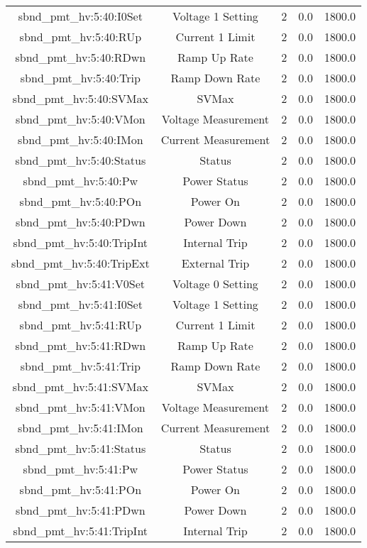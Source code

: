 \begin{center}
\begin{longtable}{c | c c c c }
sbnd\_pmt\_hv:5:40:I0Set & Voltage 1 Setting & 2 & 0.0 & 1800.0\\ 
sbnd\_pmt\_hv:5:40:RUp & Current 1 Limit & 2 & 0.0 & 1800.0\\ 
sbnd\_pmt\_hv:5:40:RDwn & Ramp Up Rate & 2 & 0.0 & 1800.0\\ 
sbnd\_pmt\_hv:5:40:Trip & Ramp Down Rate & 2 & 0.0 & 1800.0\\ 
sbnd\_pmt\_hv:5:40:SVMax & SVMax & 2 & 0.0 & 1800.0\\ 
sbnd\_pmt\_hv:5:40:VMon & Voltage Measurement & 2 & 0.0 & 1800.0\\ 
sbnd\_pmt\_hv:5:40:IMon & Current Measurement & 2 & 0.0 & 1800.0\\ 
sbnd\_pmt\_hv:5:40:Status & Status & 2 & 0.0 & 1800.0\\ 
sbnd\_pmt\_hv:5:40:Pw & Power Status & 2 & 0.0 & 1800.0\\ 
sbnd\_pmt\_hv:5:40:POn & Power On & 2 & 0.0 & 1800.0\\ 
sbnd\_pmt\_hv:5:40:PDwn & Power Down & 2 & 0.0 & 1800.0\\ 
sbnd\_pmt\_hv:5:40:TripInt & Internal Trip & 2 & 0.0 & 1800.0\\ 
sbnd\_pmt\_hv:5:40:TripExt & External Trip & 2 & 0.0 & 1800.0\\ 
sbnd\_pmt\_hv:5:41:V0Set & Voltage 0 Setting & 2 & 0.0 & 1800.0\\ 
sbnd\_pmt\_hv:5:41:I0Set & Voltage 1 Setting & 2 & 0.0 & 1800.0\\ 
sbnd\_pmt\_hv:5:41:RUp & Current 1 Limit & 2 & 0.0 & 1800.0\\ 
sbnd\_pmt\_hv:5:41:RDwn & Ramp Up Rate & 2 & 0.0 & 1800.0\\ 
sbnd\_pmt\_hv:5:41:Trip & Ramp Down Rate & 2 & 0.0 & 1800.0\\ 
sbnd\_pmt\_hv:5:41:SVMax & SVMax & 2 & 0.0 & 1800.0\\ 
sbnd\_pmt\_hv:5:41:VMon & Voltage Measurement & 2 & 0.0 & 1800.0\\ 
sbnd\_pmt\_hv:5:41:IMon & Current Measurement & 2 & 0.0 & 1800.0\\ 
sbnd\_pmt\_hv:5:41:Status & Status & 2 & 0.0 & 1800.0\\ 
sbnd\_pmt\_hv:5:41:Pw & Power Status & 2 & 0.0 & 1800.0\\ 
sbnd\_pmt\_hv:5:41:POn & Power On & 2 & 0.0 & 1800.0\\ 
sbnd\_pmt\_hv:5:41:PDwn & Power Down & 2 & 0.0 & 1800.0\\ 
sbnd\_pmt\_hv:5:41:TripInt & Internal Trip & 2 & 0.0 & 1800.0\\ 

\end{longtable}
\end{center}
